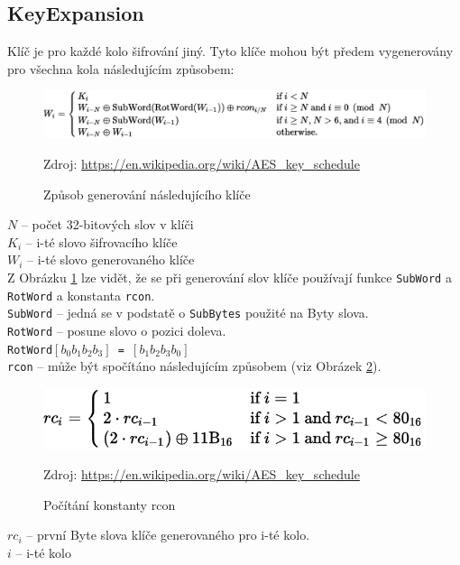 \documentclass[12pt]{article}
\begin{document}
\subsection{KeyExpansion}
Klíč je pro každé kolo šifrování jiný. Tyto klíče mohou být předem vygenerovány
pro všechna kola následujícím způsobem:
\begin{figure} [ht]
	\centering
	\includegraphics[width=\textwidth]{img/key_expansion_schedule.pdf}
	\caption{Způsob generování následujícího klíče}
	Zdroj: \url{https://en.wikipedia.org/wiki/AES\_key\_schedule}
	\label{fig:key_exp_schedule}
\end{figure}

\noindent\texttt{\textbf{$N$}} -- počet 32-bitových slov v klíči\\
\texttt{\textbf{$K_{i}$}} -- i-té slovo šifrovacího klíče\\
\texttt{\textbf{$W_{i}$}} -- i-té slovo generovaného klíče\\

Z Obrázku \ref{fig:key_exp_schedule} lze vidět, že se při generování slov klíče
používají funkce \texttt{SubWord} a \texttt{RotWord} a konstanta \texttt{rcon}.\\

\noindent\texttt{SubWord} -- jedná se v podstatě o \texttt{SubBytes} použité na
			Byty slova.\\
\texttt{RotWord} -- posune slovo o pozici doleva.\\
\indent\texttt{RotWord$[b_0 b_1 b_2 b_3]$ = $[b_1 b_2 b_3 b_0]$}\\
\texttt{rcon} -- může být spočítáno následujícím způsobem (viz Obrázek \ref{fig:key_exp_rc}).\\
\begin{figure} [ht]
	\centering
	\includegraphics[width=\textwidth]{img/key_expansion_rc.pdf}
	\caption{Počítání konstanty rcon}
	Zdroj: \url{https://en.wikipedia.org/wiki/AES\_key\_schedule}
	\label{fig:key_exp_rc}
\end{figure}

\noindent\texttt{\textbf{$rc_i$}} -- první Byte slova klíče generovaného pro
					i-té kolo.\\
\texttt{\textbf{$i$}} -- i-té kolo\\
\pagebreak
%
\end{document}
